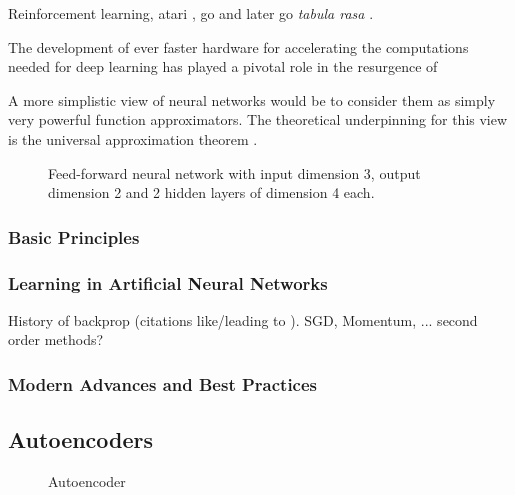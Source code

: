 Reinforcement learning, atari \cite{deep_atari}, go \cite{alphago} and later go \textit{tabula rasa} \cite{alphazero}.

The development of ever faster hardware for accelerating the computations needed for deep learning has played a pivotal role in the resurgence of 

A more simplistic view of neural networks would be to consider them as simply very powerful function approximators. The theoretical underpinning for this view is the universal approximation theorem \cite{universal_approximation_theorem}.

\begin{figure}[!htb]
  \centering
  \resizebox{\textwidth}{!}{\unskip}
  \caption{Feed-forward neural network with input dimension 3, output dimension 2 and 2 hidden layers of dimension 4 each.}
  \label{fig:ae}
\end{figure}

\subsubsection{Basic Principles}
\newpage \phantom{x}
\newpage

\subsubsection{Learning in Artificial Neural Networks}

History of backprop (citations like/leading to \cite{nature_backprop}). SGD, Momentum, ... second order methods?

\newpage \phantom{x}
\newpage

\subsubsection{Modern Advances and Best Practices}
\newpage \phantom{x}
\newpage

\subsection{Autoencoders}
\label{subsection:autoencoders}

\begin{figure}[!htb]
  \centering
  \resizebox{\textwidth}{!}{\unskip}
  \caption{Autoencoder}
  \label{fig:ae}
\end{figure}

\newpage \phantom{x}
\newpage

